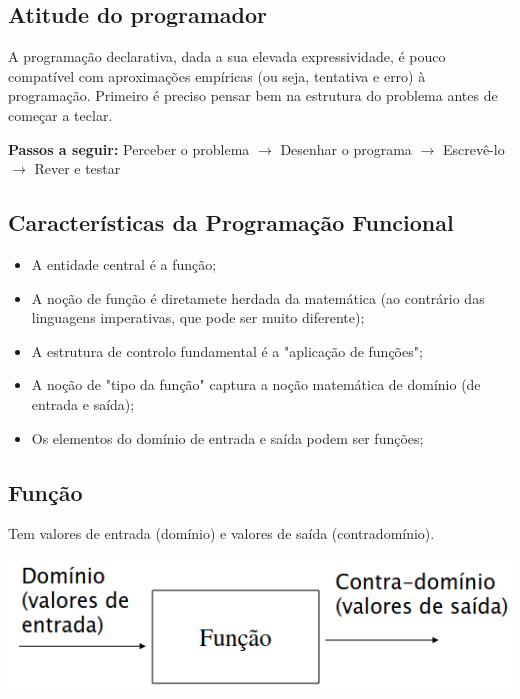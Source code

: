 \documentclass{article}
\begin{document}
\subsection{Atitude do programador}

A programação declarativa, dada a sua elevada expressividade, é pouco
compatível com aproximações empíricas (ou seja, tentativa e erro) à programação.
Primeiro é preciso pensar bem na estrutura do problema antes de começar a teclar.

\vspace{2mm}

\begin{flushleft}
  \textbf{Passos a seguir:} Perceber o problema $\rightarrow$ Desenhar o programa $\rightarrow$
  Escrevê-lo $\rightarrow$ Rever e testar
\end{flushleft}

\subsection{Características da Programação Funcional}

\begin{itemize}
  \item A entidade central é a função;
  \item A noção de função é diretamete herdada da matemática (ao contrário das
  linguagens imperativas, que pode ser muito diferente);
  \item A estrutura de controlo fundamental é a "aplicação de funções";
  \item A noção de "tipo da função" captura a noção matemática de
  domínio (de entrada e saída);
  \item Os elementos do domínio de entrada e saída podem ser funções;
\end{itemize}

\subsection{Função}

Tem valores de entrada (domínio) e valores de saída (contradomínio).

\begin{center}
\includegraphics[scale=0.4]{2}
\end{center}
\end{document}
